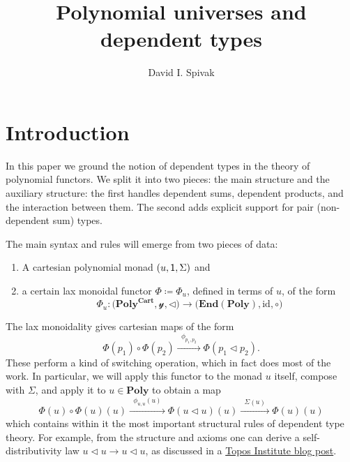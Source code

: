\documentclass[11pt, one side, article]{memoir}
\theoremstyle{definition}
\theoremstyle{plain}
\newcommand{\Cat}[1]{\mathbf{#1}}%
\newcommand{\id}{\mathrm{id}}
\newcommand{\too}{\longrightarrow}
\newcommand{\Too}[1]{\xrightarrow{\;\;#1\;\;}}
\newcommand{\en}{\Cat{End}}
\newcommand{\yon}{\mathcal{y}}
\newcommand{\poly}{\Cat{Poly}}
\newcommand{\polycart}{\poly^{\Cat{Cart}}}
\newcommand{\0}{\textsf{0}}
\newcommand{\1}{\tn{\textsf{1}}}
\newcommand{\tri}{\mathbin{\triangleleft}}
\begin{document}
\title{Polynomial universes and dependent types}

\author{David I. Spivak}

\date{\vspace{-.2in}}

\maketitle

\begin{abstract}
\end{abstract}


\chapter{Introduction}

In this paper we ground the notion of dependent types in the theory of polynomial functors. We split it into two pieces: the main structure and the auxiliary structure: the first handles dependent sums, dependent products, and the interaction between them. The second adds explicit support for pair (non-dependent sum) types. 

The main syntax and rules will emerge from two pieces of data:
\begin{enumerate}
	\item A cartesian polynomial monad $(u,\1,\Sigma)$ and
	\item a certain lax monoidal functor $\Phi\coloneqq\Phi_u$, defined in terms of $u$, of the form
\[
\Phi_u\colon\Big(\polycart,\yon,\tri\Big)\too\Big(\en(\poly),\id,\circ\Big)
\]
\end{enumerate}
The lax monoidality gives cartesian maps of the form 
\[
\Phi(p_1)\circ\Phi(p_2)
\Too{\phi_{p_1,p_2}}
\Phi(p_1\tri p_2).
\]
These perform a kind of switching operation, which in fact does most of the work. In particular, we will apply this functor to the monad $u$ itself, compose with $\Sigma$, and apply it to $u\in\poly$ to obtain a map
\begin{equation}\label{eqn.main}
  \Phi(u)\circ\Phi(u)(u)
  \Too{\phi_{u,u}(u)}
  \Phi(u\tri u)(u)
  \Too{\Sigma(u)}
  \Phi(u)(u)
\end{equation}
which contains within it the most important structural rules of dependent type theory. For example, from the structure and axioms one can derive a self-distributivity law $u\tri u\to u\tri u$, as discussed in a \href{https://topos.site/blog/2021/07/jump-monads-from-conjugation-to-dependent-types/}{Topos Institute blog post}.
\end{document}
